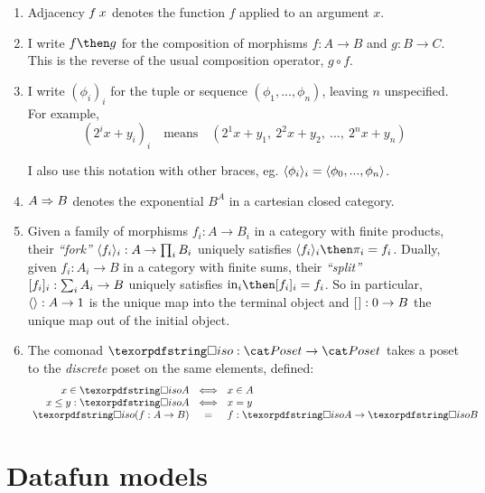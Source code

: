 \documentclass[nomarginums]{rntz}\usepackage[tablet]{fantasy}%
\begin{document}
\begin{enumerate}
\item Adjacency $f\<x$ denotes the function $f$ applied to an argument $x$.

\item I write $f \then g$ for the composition of morphisms $f : A \to B$ and $g
  : B \to C$. This is the reverse of the usual composition operator, $g \circ
  f$.

  \newcommand\iexpr{\phi}
\item I write $(\iexpr_i)_i$ for the tuple or sequence $(\iexpr_1,
  ..., \iexpr_n)$, leaving $n$ unspecified. For example,
  \[ (2^ix + y_i)_i \quad\text{means}\quad
  (2^1x + y_1,~ 2^2x + y_2,~ ...,~ 2^nx + y_n) \]

  \noindent
  I also use this notation with other braces, eg. $\fork{\iexpr_i}_i =
  \fork{\iexpr_0, ..., \iexpr_n}$.

\item $A \Rightarrow B$ denotes the exponential $B^A$ in a cartesian closed category.

\item Given a family of morphisms $f_i : A \to B_i$ in a category with finite
  products, their \emph{``fork''} $\langle{f_i}\rangle_i : A \to \textstyle\prod_{i} B_i$
  uniquely satisfies $\fork{f_i}_i \then \pi_i = f_i$. Dually, given $f_i : A_i
  \to B$ in a category with finite sums, their \emph{``split''} $[{f_i}]_i :
  \sum_i A_i \to B$ uniquely satisfies $\injc_i \then \krof{f_i}_i = f_i$.
  So in particular, $\langle{}\rangle : A \to 1$ is the unique map into the terminal
  object and $[{\kern .08em}] : 0 \to B$ the unique map out of the initial object.

\item The comonad $\iso : \Poset \to \Poset$ takes a poset to the
  \emph{discrete} poset on the same elements, defined:
  \[\setlength\arraycolsep{.33em}
  \begin{array}{rcl}
    x \in \isof A &\iff& x \in A\\
    x \le y : \isof A &\iff& x = y\\
    \isof(f : A \to B) &=& f : \isof A \to \isof B
  \end{array}\]
\end{enumerate}


\section{Datafun models}
\label{sec:datafun-models}
\end{document}
